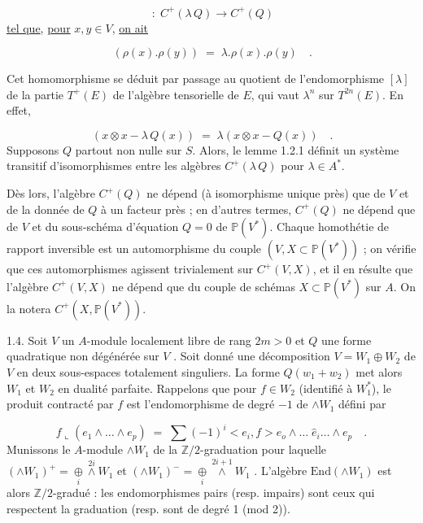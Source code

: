 \begin{equation*}
[\lambda] \;:\; C^{+}(\lambda\, Q) \longrightarrow C^{+}(Q)
\end{equation*}
\underline{tel que}, \underline{pour} $x, y \in V$, \underline{on ait}

\begin{equation*}
[\lambda]\,(\rho(x).\rho(y)) \;=\; \lambda.\rho(x).\rho(y) \quad .
\end{equation*}


Cet homomorphisme se déduit par passage au quotient de l'endomorphisme $[\lambda]$ de la partie $T^{+}(E)$ de l'algèbre tensorielle de $E$, qui vaut $\lambda^{n}$ sur $T^{2n}(E)$. En effet,

\begin{equation*}
[\lambda]\,(x \otimes x - \lambda\, Q(x)) \;=\; \lambda(x \otimes x - Q(x)) \quad .
\end{equation*}
Supposons $Q$ partout non nulle sur $S$. Alors, le lemme 1.2.1 définit un système transitif d'isomorphismes entre les algèbres $C^{+}(\lambda\, Q)$ pour $\lambda \in A^{*}$.

Dès lors, l'algèbre $C^{+}(Q)$ ne dépend (à isomorphisme unique près) que de $V$ et de la donnée de $Q$ à un facteur près ; en d'autres termes, $C^{+}(Q)$ ne dépend que de $V$ et du sous-schéma d'équation $Q = 0$ de $\mathbb{P}(V^{*})$. Chaque homothétie de rapport inversible est un automorphisme du couple $(V, X \subset \mathbb{P}(V^{*}))$ ; on vérifie que ces automorphismes agissent trivialement sur $C^{+}(V, X)$, et il en résulte que l'algèbre $C^{+}(V, X)$ ne dépend que du couple de schémas $X \subset \mathbb{P}(V^{*})$ sur $A$. On la notera $C^{+}(X, \mathbb{P}(V^{*}))$.

1.4. Soit $V$ un $A$-module localement libre de rang $2m > 0$ et $Q$ une forme quadratique non dégénérée sur $V$ . Soit donné une décomposition $V = W_1 \oplus W_2$ de $V$ en deux sous-espaces totalement singuliers. La forme $Q(w_1 + w_2)$ met alors $W_1$ et $W_2$ en dualité parfaite. Rappelons que pour $f \in W_2$ (identifié à $W_1^{*}$), le produit contracté par $f$ est l'endomorphisme de degré $-1$ de $\wedge W_1$ défini par

\begin{equation*}
f \llcorner (e_1 \wedge \ldots \wedge e_p) \;=\; \sum (-1)^{i} < e_i , f > e_o \wedge \ldots \; \hat{e}_i \ldots \wedge e_p \quad .
\end{equation*}
Munissons le $A$-module $\wedge W_1$ de la $\mathbb{Z}/2$-graduation pour laquelle
$(\wedge W_1)^+ = \underset{i}{\oplus} \overset{2i}{\wedge} W_1$ et $(\wedge W_1)^- = \underset{i}{\oplus} \overset{2i+1}{\wedge} W_1$ . L'algèbre $\mathrm{End}(\wedge W_1)$ est alors $\mathbb{Z}/2$-gradué : les endomorphismes pairs (resp. impairs) sont ceux qui respectent la graduation (resp. sont de degré 1 (mod 2)).

